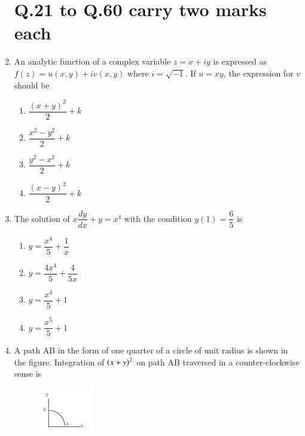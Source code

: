 \documentclass[journal]{IEEEtran}
\begin{document}
\begin{enumerate}[leftmargin=0pt]
\section*{\textbf{Q.21 to Q.60 carry two marks each}} 





\item An analytic function of a complex variable $z = x + iy$ is expressed as $f(z) = u(x,y) + iv(x,y)$ where $i = \sqrt{-1}$. If $u = xy$, the expression for $v$ should be
\begin{enumerate}
  \item $\dfrac{(x+y)^2}{2} + k$
  \item $\dfrac{x^2 - y^2}{2} + k$
  \item $\dfrac{y^2 - x^2}{2} + k$
  \item $\dfrac{(x-y)^2}{2} + k$
\end{enumerate}
\hfill{}



\item The solution of $x \dfrac{dy}{dx} + y = x^4$ with the condition $y(1) = \dfrac{6}{5}$ is
\begin{enumerate}
  \item $y = \dfrac{x^4}{5} + \dfrac{1}{x}$
  \item $y = \dfrac{4x^4}{5} + \dfrac{4}{5x}$
  \item $y = \dfrac{x^4}{5} + 1$
  \item $y = \dfrac{x^5}{5} + 1$
\end{enumerate}
\hfill{}




\item A path AB in the form of one quarter of a circle of unit radius is shown in the figure. Integration of $\left(x + y\right)^2$ on path AB traversed in a counter-clockwise sense is
\begin{figure}[h] 
  \centering
  \includegraphics[width=0.23\textwidth]{Figs/image (4).png}
  \caption{}
  \label{fig:23}
\end{figure}

\begin{enumerate}
\end{enumerate}
\hfill{}



\end{enumerate}
\end{document}
